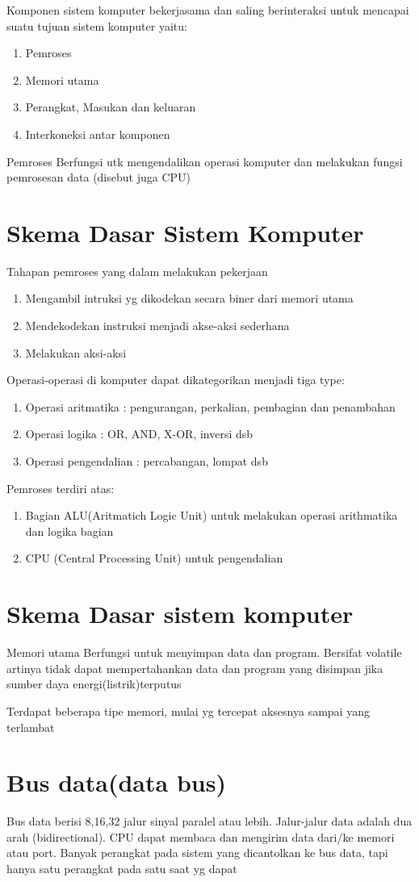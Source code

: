Komponen sistem komputer bekerjasama dan saling berinteraksi untuk mencapai suatu tujuan sistem komputer yaitu:
\begin{enumerate}
\item Pemroses
\item Memori utama
\item Perangkat, Masukan dan keluaran
\item Interkoneksi antar komponen
\end{enumerate}

Pemroses
Berfungsi utk mengendalikan operasi komputer dan melakukan fungsi pemrosesan data (disebut juga CPU)

\section{Skema Dasar Sistem Komputer}
Tahapan pemroses yang dalam melakukan pekerjaan
\begin{enumerate}
\item Mengambil intruksi yg dikodekan secara biner dari memori utama
\item Mendekodekan instruksi menjadi akse-aksi sederhana
\item Melakukan aksi-aksi
\end{enumerate}

Operasi-operasi di komputer dapat dikategorikan menjadi tiga type:
\begin{enumerate}
\item Operasi aritmatika : pengurangan, perkalian, pembagian dan penambahan
\item Operasi logika : OR, AND, X-OR, inversi dsb
\item Operasi pengendalian : percabangan, lompat dsb
\end{enumerate}

Pemroses terdiri atas:
\begin{enumerate}
\item Bagian ALU(Aritmatich Logic Unit) untuk melakukan operasi arithmatika dan logika bagian
\item CPU (Central Processing Unit) untuk pengendalian 
\end{enumerate}

\section{Skema Dasar sistem komputer}
Memori utama
Berfungsi untuk menyimpan data dan program. Bersifat volatile artinya tidak dapat mempertahankan data dan program yang disimpan jika sumber daya energi(listrik)terputus

Terdapat beberapa tipe memori, mulai yg tercepat aksesnya sampai yang terlambat

\section{Bus data(data bus)}
Bus data berisi 8,16,32 jalur sinyal paralel atau lebih. Jalur-jalur data adalah dua arah (bidirectional). CPU dapat membaca dan mengirim data dari/ke memori atau port. 
Banyak perangkat pada sistem yang dicantolkan ke bus data, tapi hanya satu perangkat pada satu saat yg dapat